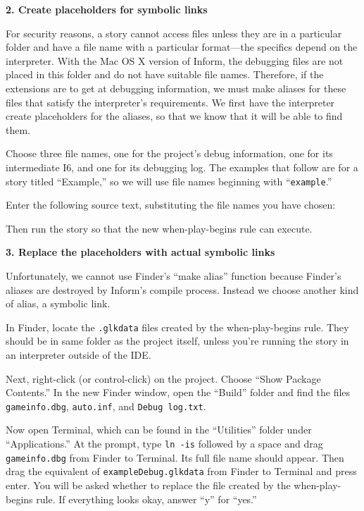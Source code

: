 \documentclass{book}
\begin{document}
\textbf{2. Create placeholders for symbolic links}

For security reasons, a story cannot access files unless they are in a
particular folder and have a file name with a particular format---the specifics
depend on the interpreter.  With the Mac OS X version of Inform, the debugging
files are not placed in this folder and do not have suitable file names.
Therefore, if the extensions are to get at debugging information, we must make
aliases for these files that satisfy the interpreter's requirements.  We first
have the interpreter create placeholders for the aliases, so that we know that
it will be able to find them.

Choose three file names, one for the project's debug information, one for its
intermediate I6, and one for its debugging log.  The examples that follow are
for a story titled ``Example,'' so we will use file names beginning with
``\texttt{example}.''

Enter the following source text, substituting the file names you have chosen:

\begin{quote}
  
\end{quote}

Then run the story so that the new when-play-begins rule can execute.

\textbf{3. Replace the placeholders with actual symbolic links}

Unfortunately, we cannot use Finder's ``make alias'' function because Finder's
aliases are destroyed by Inform's compile process.  Instead we choose another
kind of alias, a symbolic link.

In Finder, locate the \texttt{.glkdata} files created by the when-play-begins
rule.  They should be in same folder as the project itself, unless you're
running the story in an interpreter outside of the IDE.

Next, right-click (or control-click) on the project.  Choose ``Show Package
Contents.''  In the new Finder window, open the ``Build'' folder and find the
files \texttt{gameinfo.dbg}, \texttt{auto.inf}, and \texttt{Debug log.txt}.

Now open Terminal, which can be found in the ``Utilities'' folder under
``Applications.''  At the prompt, type \texttt{ln -is} followed by a space and
drag \texttt{gameinfo.dbg} from Finder to Terminal.  Its full file name should
appear.  Then drag the equivalent of \texttt{exampleDebug.glkdata} from Finder
to Terminal and press enter.  You will be asked whether to replace the file
created by the when-play-begins rule.  If everything looks okay, answer ``y''
for ``yes.''
\end{document}
